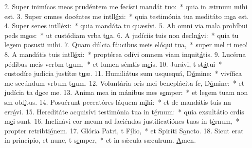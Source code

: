 2. Super inimícos meos prudéntem me fecísti mandát t\uline{u}o:~* quia in ætrnum m\uline{i}hi est.
3. Super omnes docéntes me intll\uline{é}xi:~* quia testimónia tua meditáto m\uline{e}a est.
4. Super senes intll\uline{é}xi:~* quia mandáta tu quæs\uline{í}vi.
5. Ab omni via mala prohíbui peds m\uline{e}os:~* ut custódiam vrba t\uline{u}a.
6. A judíciis tuis non decln\uline{á}vi:~* quia tu legem posusti m\uline{i}hi.
7. Quam dúlcia fáucibus meis elóqui t\uline{u}a,~* super mel ri m\uline{e}o!
8. A mandátis tuis intll\uline{é}xi:~* proptérea odívi omnem viam inquit\uline{á}tis.
9. Lucérna pédibus meis verbm t\uline{u}um,~* et lumen sémtis m\uline{e}is.
10. Jurávi, t st\uline{á}tui~* custodíre judícia justítæ t\uline{u}æ.
11. Humiliátus sum usquequá, D\uline{ó}mine:~* vivífica me secúndum vrbum t\uline{u}um.
12. Voluntária oris mei beneplácita fc, D\uline{ó}mine:~* et judícia ta d\uline{o}ce me.
13. Anima mea in mánibus mes s\uline{e}mper:~* et legem tuam non sm obl\uline{í}tus.
14. Posuérunt peccatóres láquem m\uline{i}hi:~* et de mandátis tuis nn err\uline{á}vi.
15. Hereditáte acquisívi testimónia tua in t\uline{é}rnum:~* quia exsultátio crdis m\uline{e}i sunt.
16. Inclinávi cor meum ad faciéndas justificatiónes tuas in t\uline{é}rnum,~* propter retribti\uline{ó}nem.
17. Glória Patri, t F\uline{í}lio,~* et Spiríti S\uline{a}ncto.
18. Sicut erat in princípio, et nunc, t s\uline{e}mper,~* et in sǽcula sæculrum. \uline{A}men.

